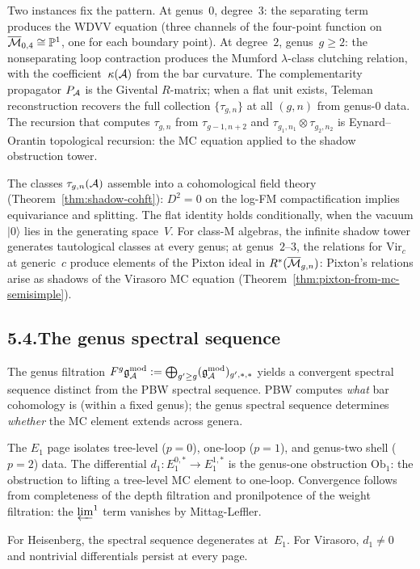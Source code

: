 Two instances fix the pattern. At genus~$0$, degree~$3$: the
separating term produces the WDVV equation (three channels of
the four-point function on $\overline{\mathcal{M}}_{0,4}\cong\mathbb
P^1$, one for each boundary point). At degree~$2$,
genus~$g\ge 2$: the nonseparating loop contraction produces
the Mumford $\lambda$-class clutching relation, with the
coefficient~$\kappa(\mathcal{A})$ from the bar curvature. The
complementarity propagator $P_{\mathcal{A}}$ is the Givental $R$-matrix;
when a flat unit exists, Teleman reconstruction recovers the
full collection $\{\tau_{g,n}\}$ at all $(g,n)$ from genus-$0$
data. The recursion that computes $\tau_{g,n}$ from
$\tau_{g-1,n+2}$ and $\tau_{g_1,n_1}\otimes\tau_{g_2,n_2}$ is
Eynard--Orantin topological recursion: the MC equation applied
to the shadow obstruction tower.

The classes $\tau_{g,n}(\mathcal{A})$ assemble into a cohomological
field theory (Theorem~\ref{thm:shadow-cohft}): $D^2=0$ on the
log-FM compactification implies equivariance and splitting.
The flat identity holds conditionally, when the vacuum
$|0\rangle$ lies in the generating space~$V$. For class-M
algebras, the infinite shadow tower generates tautological
classes at every genus; at genus~$2$--$3$, the relations for
$\mathrm{Vir}_c$ at generic~$c$ produce elements of the Pixton
ideal in $R^*(\overline{\mathcal{M}}_{g,n})$: Pixton's relations arise
as shadows of the Virasoro MC equation
(Theorem~\ref{thm:pixton-from-mc-semisimple}).

\subsection*{5.4.\enspace The genus spectral sequence}

The genus filtration $F^g\mathfrak{g}_{\mathcal{A}}^{\mathrm{mod}}:=\bigoplus_{g'\ge g}
(\mathfrak{g}_{\mathcal{A}}^{\mathrm{mod}})_{g',*,*}$ yields a convergent spectral sequence
distinct from the PBW spectral sequence. PBW computes
\emph{what} bar cohomology is (within a fixed genus);
the genus spectral sequence determines \emph{whether} the MC
element extends across genera.

The $E_1$ page isolates tree-level ($p=0$), one-loop ($p=1$),
and genus-two shell ($p=2$) data. The differential
$d_1\colon E_1^{0,*}\to E_1^{1,*}$ is the genus-one
obstruction $\mathrm{Ob}_1$: the obstruction to lifting a
tree-level MC element to one-loop. Convergence follows from
completeness of the depth filtration and pronilpotence of the
weight filtration: the $\varprojlim^1$ term vanishes by
Mittag-Leffler.

For Heisenberg, the spectral sequence degenerates at~$E_1$.
For Virasoro, $d_1\neq 0$ and nontrivial differentials persist
at every page.

